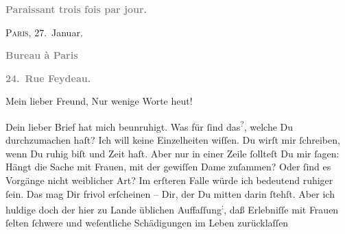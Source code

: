 \pstart
           \begin{otherlanguage}{french}\textcolor{gray}{\textbf{\textbf{Paraissant trois fois par jour.}}}\end{otherlanguage}\hfill \textsc{Paris}, 27. Januar.\pend
           
\pstart
           \begin{otherlanguage}{french}\textcolor{gray}{\textbf{\textbf{Bureau à Paris}}}\end{otherlanguage}\pend
           
\pstart
           \begin{otherlanguage}{french}\textcolor{gray}{\textbf{\textbf{24. Rue Feydeau.}}}\end{otherlanguage}\pend
           
\pstart\center{}Mein lieber Freund,\pend\vspace{0.5em}
\pstart
           Nur wenige Worte heut!\pend
           
\pstart
           Dein lieber Brief hat mich beunruhigt. Was für \label{K_L02801-1v}\label{K_L02801-1}{ }ſind das\substVorne{}\textsuperscript{?}\substDazwischen{},\substHinten{} welche Du durchzumachen haſt? Ich will keine Einzelheiten wiſſen. Du wirſt
               mir{ }ſchreiben, wenn Du ruhig biſt und Zeit haſt. Aber nur in einer Zeile{ }ſollteſt Du
               mir{ }ſagen: Hängt die Sache mit Frauen, mit der gewiſſen Dame zuſammen? Oder{ }ſind es Vorgänge nicht
               weiblicher Art? Im erſteren Falle würde ich bedeutend ruhiger ſein. Das mag Dir frivol erſcheinen – Dir, der Du mitten darin{ }ſtehſt. Aber
               ich {\pb}huldige doch der hier zu Lande üblichen Auffaſſung\substVorne{}\textsuperscript{:}\substDazwischen{},\substHinten{} daß Erlebniſſe mit Frauen{ }ſelten{ }ſchwere und weſentliche Schädigungen im
               Leben zurücklaſſen{\dotsfour}\pend
           
